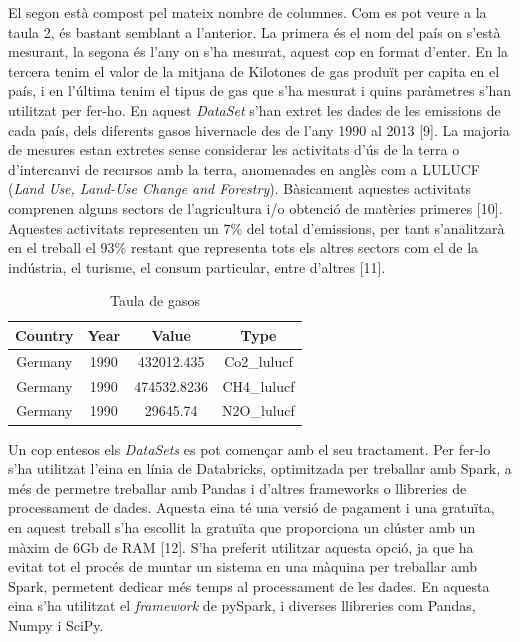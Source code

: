 \documentclass[10pt,a4paper,twocolumn,twoside]{article}
\begin{document}
El segon està compost pel mateix nombre de columnes. Com es pot veure a la taula 2, és bastant semblant a l'anterior. La primera és el nom del país on s'està mesurant, la segona és l'any on s'ha mesurat, aquest cop en format d'enter. En la tercera tenim el valor de la mitjana de Kilotones de gas produït per capita en el país, i en l'última tenim el tipus de gas que s'ha mesurat i quins paràmetres s'han utilitzat per fer-ho. En aquest \textit{DataSet} s'han extret les dades de les emissions de cada país, dels diferents gasos hivernacle des de l'any 1990 al 2013 [9]. La majoria de mesures estan extretes sense considerar les activitats d'ús de la terra o d'intercanvi de recursos amb la terra, anomenades en anglès com a LULUCF (\textit{Land Use, Land-Use Change and Forestry}). Bàsicament aquestes activitats comprenen alguns sectors de l'agricultura i/o obtenció de matèries primeres [10]. Aquestes activitats representen un 7\% del total d'emissions, per tant s'analitzarà en el treball el 93\% restant que representa tots els altres sectors com el de la indústria, el turisme, el consum particular, entre d'altres [11].
\begin{table}[th]
\caption{Taula de gasos}
\begin{center}
\begin{tabular}{c c c c} %
\hline\hline %
Country & Year & Value & Type \\
\hline
Germany & 1990 & 432012.435 & Co2\_lulucf \\
Germany & 1990 & 474532.8236 & CH4\_lulucf \\
Germany & 1990 & 29645.74 & N2O\_lulucf \\
\hline
\end{tabular}
\end{center}
\end{table}

Un cop entesos els \textit{DataSets} es pot començar amb el seu tractament. Per fer-lo s'ha utilitzat l'eina en línia de Databricks, optimitzada per treballar amb Spark, a més de permetre treballar amb Pandas i d'altres frameworks o llibreries de processament de dades. Aquesta eina té una versió de pagament i una gratuïta, en aquest treball s'ha escollit la gratuïta que proporciona un clúster amb un màxim de 6Gb de RAM [12]. S'ha preferit utilitzar aquesta opció, ja que ha evitat tot el procés de muntar un sistema en una màquina per treballar amb Spark, permetent dedicar més temps al processament de les dades. En aquesta eina s'ha utilitzat el \textit{framework} de pySpark, i diverses llibreries com Pandas, Numpy i SciPy.
\end{document}
